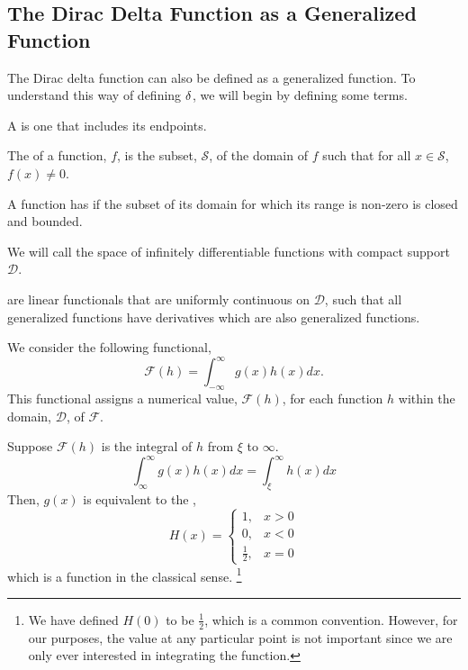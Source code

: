 

\subsection{The Dirac Delta Function as a Generalized Function}
The Dirac delta function can also be defined as a generalized function. To understand this way of defining \(\delta\), we will begin by defining some terms.

\begin{definition}
     A  is one that includes its endpoints.
\end{definition}

\begin{definition}
    The  of a function, \(f\), is the subset, \(\mathcal{S}\), of the domain of \(f\) such that for all \(x\in \mathcal{S}\), \(f(x) \neq 0\).
\end{definition}

\begin{definition}
    A function has  if the subset of its domain for which its range is non-zero is closed and bounded.
\end{definition}
We will call the space of infinitely differentiable functions with compact support \(\mathcal{D}\).

\begin{definition}
     are linear functionals that are uniformly continuous on \(\mathcal{D}\), such that all generalized functions have derivatives which are also generalized functions.
\end{definition}

We consider the following functional,
\begin{equation}\label{eq:generalizedFunction}
    \mathcal{F}(h) = \int_{-\infty}^{\infty} g(x)h(x)dx.
\end{equation}
This functional assigns a numerical value, \(\mathcal{F}(h)\), for each function \(h\) within the domain, \(\mathcal{D}\), of \(\mathcal{F}\).

\begin{example}
    Suppose \(\mathcal{F}(h)\) is the integral of \(h\) from \(\xi\) to \(\infty\).
    \begin{equation}
        \int_{\infty}^{\infty} g(x)h(x)dx = \int_{\xi}^{\infty} h(x) dx
    \end{equation}
    Then, \(g(x)\) is equivalent to the ,
    \begin{equation}
        H(x) = \begin{cases}
            1, & x>0\\
            0, & x<0\\
            \frac{1}{2}, & x=0
        \end{cases}
    \end{equation}
    which is a function in the classical sense. \footnote{We have defined \(H(0)\) to be \(\frac{1}{2}\), which is a common convention. However, for our purposes, the value at any particular point is not important since we are only ever interested in integrating the function.}    
\end{example}

